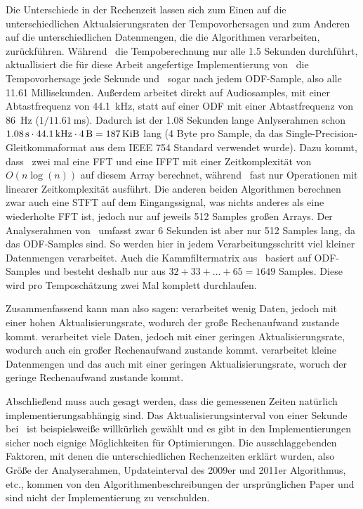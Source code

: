 {{		%
		Die Unterschiede in der Rechenzeit lassen sich zum Einen auf die unterschiedlichen Aktualsierungsraten der Tempovorhersagen
			und zum Anderen auf die unterschiedlichen Datenmengen,
			die die Algorithmen verarbeiten,
			zurückführen.
		Während~\cite{2009_DaPlSt} die Tempoberechnung nur alle \num{1.5} Sekunden durchführt,
			aktuallisiert die für diese Arbeit angefertige Implementierung von~\cite{2001_BeatThis} die Tempovorhersage jede Sekunde
			und~\cite{2011_PlRoSt} sogar nach jedem ODF-Sample,
			also alle \num{11.61} Millisekunden.
		Außerdem arbeitet \cite{2001_BeatThis} direkt auf Audiosamples,
			mit einer Abtastfrequenz von \SI{44.1}{\kilo\hertz},
			statt auf einer ODF mit einer Abtastfrequenz von \SI{86}{\hertz} ($1 / \SI{11.61}{\milli\second}$).
		Dadurch ist der \num{1.08} Sekunden lange Anlyserahmen schon $\SI{1.08}{\second} \cdot \SI{44.1}{\kilo\hertz} \cdot \SI{4}{\byte} = \SI{187}{\kibi\byte}$ lang (\num{4} Byte pro Sample, da das Single-Precision-Gleitkommaformat aus dem IEEE 754 Standard verwendet wurde).
		Dazu kommt,
			dass~\cite{2001_BeatThis} zwei mal eine FFT und eine IFFT mit einer Zeitkomplexität von $O(n\log(n))$ auf diesem Array berechnet,
			während~\cite{2009_DaPlSt} fast nur Operationen mit linearer Zeitkomplexität ausführt.
		Die anderen beiden Algorithmen berechnen zwar auch eine STFT auf dem Eingangssignal,
			was nichts anderes als eine wiederholte FFT ist,
			jedoch nur auf jeweils \num{512} Samples großen Arrays.
		Der Analyserahmen von~\cite{2009_DaPlSt} umfasst zwar \num{6} Sekunden
			ist aber nur \num{512} Samples lang,
			da das ODF-Samples sind.
		So werden hier in jedem Verarbeitungsschritt viel kleiner Datenmengen verarbeitet.
		Auch die Kammfiltermatrix aus~\cite{2011_PlRoSt} basiert auf ODF-Samples
			und besteht deshalb nur aus $32 + 33 + ... + 65 = 1649$ Samples.
		Diese wird pro Temposchätzung zwei Mal komplett durchlaufen.

		Zusammenfassend kann man also sagen:
		\cite{2011_PlRoSt} verarbeitet wenig Daten,
			jedoch mit einer hohen Aktualisierungsrate,
			wodurch der große Rechenaufwand zustande kommt.
		\cite{2001_BeatThis} verarbeitet viele Daten,
			jedoch mit einer geringen Aktualisierungsrate,
			wodurch auch ein großer Rechenaufwand zustande kommt.
		\cite{2009_DaPlSt} verarbeitet kleine Datenmengen
			und das auch mit einer geringen Aktualisierungsrate,
			woruch der geringe Rechenaufwand zustande kommt.

		Abschließend muss auch gesagt werden,
			dass die gemessenen Zeiten natürlich implementierungsabhängig sind.
		Das Aktualisierungsinterval von einer Sekunde bei~\cite{2001_BeatThis} ist beispielsweiße willkürlich gewählt
			und es gibt in den Implementierungen sicher noch eignige Möglichkeiten für Optimierungen.
		Die ausschlaggebenden Faktoren,
			mit denen die unterschiedlichen Rechenzeiten erklärt wurden,
			also Größe der Analyserahmen,
			Updateinterval des 2009er und 2011er Algorithmus,
			etc.,
			kommen von den Algorithmenbeschreibungen der ursprünglichen Paper
			und sind nicht der Implementierung zu verschulden.
	}
}
